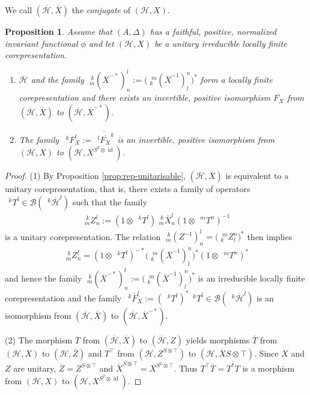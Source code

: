 \documentclass[12pt]{article}
\theoremstyle{change}
\DeclareMathOperator{\id}{id}
\newcommand{\Gr}[5]{\;{}^{\;#2}_{#4}#1_{#5}^{#3}}%
\newcommand{\Gru}[3]{\;{}^{\;#2}#1^{#3}}
\newtheorem{Prop}[Theorem]{Proposition}
\theoremstyle{definition}
\numberwithin{equation}{section}
\begin{document}
We call $(\overline{\mathcal{H}},\overline{X})$ the \emph{conjugate} of 
$(\mathcal{H},X)$.   
\begin{Prop} \label{prop:rep-f}
  Assume that $(A,\Delta)$ has a faithful, positive, normalized
  invariant functional $\phi$ and let $(\mathcal{H},X)$ be a unitary
  irreducible locally finite corepresentation. 
  \begin{enumerate}
  \item $\overline{\mathcal{H}}$ and the family
    $\Gr{(\overline{X}^{-*})}{k}{l}{m}{n}:=\big(\Gr{(\overline{X}^{-1})}{m}{n}{k}{l}\big)^{*}$
    form a locally finite corepresentation and there
    exists an invertible, positive isomorphism $\overline{F_{X}}$ from
    $(\overline{\mathcal{H}},\overline{X})$ to
    $(\overline{\mathcal{H}},\overline{X}^{-*})$.
  \item The family
    $\Gru{F_{X}}{k}{l}:=\overline{\Gru{\overline{F_{X}}}{l}{k}}$ is an
    invertible, positive isomorphism from $(\mathcal{H},X)$ to
    $(\mathcal{H},X^{S^{2} \otimes \id})$.
  \end{enumerate}
\end{Prop}
\begin{proof}
(1) By Proposition \ref{prop:rep-unitarisable},
$(\overline{\mathcal{H}},\overline{X})$ is equivalent to a unitary
corepresentation, that is, there exists a family of operators
$\Gru{T}{k}{l} \in \mathcal{B}(\Gru{\overline{\mathcal{H}}}{k}{l})$
such that the family 
\begin{align*}
\Gr{Z}{k}{l}{m}{n}:= (1 \otimes
\Gru{T}{k}{l})\Gr{\overline{X}}{k}{l}{m}{n}(1 \otimes
\Gru{T}{m}{n})^{-1} 
\end{align*}
 is a unitary corepresentation. The relation
 $\Gr{(Z^{-1})}{k}{l}{m}{n}=\big(\Gr{Z}{m}{n}{k}{l})^{*}$ then implies
 \begin{align*}
   \Gr{Z}{k}{l}{m}{n} = (1 \otimes
   \Gru{T}{k}{l})^{-*}\big(\Gr{(\overline{X}^{-1})}{m}{n}{k}{l}\big)^{*}(1
   \otimes \Gru{T}{m}{n})^{*}
 \end{align*}
 and hence the family 
 $\Gr{(\overline{X}^{-*})}{k}{l}{m}{n}:=\big(\Gr{(\overline{X}^{-1})}{m}{n}{k}{l}\big)^{*}$
 is an irreducible locally finite corepresentation and the family
 $\Gru{\overline{F}_{X}}{k}{l}:=(\Gru{T}{k}{l})^{*}\Gru{T}{k}{l} \in
  \mathcal{B}(\Gru{\overline{\mathcal{H}}}{k}{l})$
is an isomorphism from $(\overline{\mathcal{H}},\overline{X})$ to
$(\overline{\mathcal{H}},\overline{X}^{-*})$.   

(2) The morphism $T$  from $(\overline{\mathcal{H}},\overline{X})$  to
$(\overline{\mathcal{H}},Z)$ yields morphisms $\overline{T}$ from
$(\mathcal{H},X)$ to $(\mathcal{H},\overline{Z})$ and $T^{\top}$ from $(\mathcal{H},Z^{S\otimes\top})$ to
$(\mathcal{H},\overline{X}{S \otimes \top})$. Since $X$ and $Z$ are
unitary, $\overline{Z}=Z^{S\otimes \top}$ and  $\overline{X}^{S \otimes
  \top} = X^{S^{2} \otimes \top}$. Thus $T^{\top}\overline{T} =
\overline{T^{*}T}$ is a morphism from $(\mathcal{H},X)$ to
$(\mathcal{H},X^{S^{2}\otimes \id})$.
\end{proof}
\end{document}
